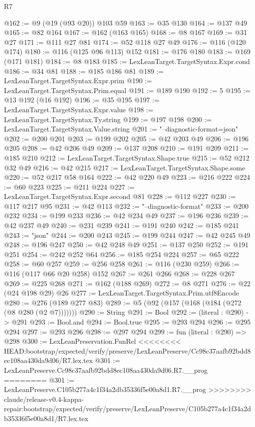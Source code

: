 \begin{lexlean}{R7}
\begin{coremodule}
{{{{{{{{{{{{{@162 := @9 (@19 (@93 @20)) @103 @59
@163 := @35 @130
@164 := @137 @49
@165 := @82 @164
@167 := @162 (@163 @165)
@168 := @8 @167
@169 := @31 @27
@171 := @111 @27 @81
@174 := @52 @118 @27 @49
@176 := @116 (@120 @174)
@180 := @116 (@125 @96 @113) @152
@181 := @176 @180
@183 := @169 (@171 @181)
@184 := @8 @183
@185 := LexLeanTarget.TargetSyntax.Expr.cond
@186 := @34 @81
@188 := @185 @186 @81
@189 := LexLeanTarget.TargetSyntax.Expr.prim
@190 := LexLeanTarget.TargetSyntax.Prim.equal
@191 := @189 @190
@192 := 5
@195 := @13 @192 (@16 @192)
@196 := @35 @195
@197 := LexLeanTarget.TargetSyntax.Expr.value
@198 := LexLeanTarget.TargetSyntax.Ty.string
@199 := @197 @198
@200 := LexLeanTarget.TargetSyntax.Value.string
@201 := "--diagnostic-format=json"
@202 := @200 @201
@203 := @199 @202
@205 := @42 @203 @49
@206 := @196 @205
@208 := @42 @206 @49
@209 := @137 @208
@210 := @191 @209
@211 := @185 @210
@212 := LexLeanTarget.TargetSyntax.Shape.true
@215 := @52 @212 @32 @49
@216 := @42 @215
@217 := LexLeanTarget.TargetSyntax.Shape.some
@220 := @52 @217 @58 @164
@222 := @42 @220 @49
@223 := @216 @222
@224 := @60 @223
@225 := @211 @224
@227 := LexLeanTarget.TargetSyntax.Expr.second @81
@228 := @112 @227
@230 := @117 @217 @95
@231 := @42 @113
@232 := "--diagnostic-format"
@233 := @200 @232
@234 := @199 @233
@236 := @42 @234 @49
@237 := @196 @236
@239 := @42 @237 @49
@240 := @231 @239
@241 := @191 @240
@242 := @185 @241
@243 := "json"
@244 := @200 @243
@245 := @199 @244
@247 := @42 @245 @49
@248 := @196 @247
@250 := @42 @248 @49
@251 := @137 @250
@252 := @191 @251
@254 := @242 @252 @64
@256 := @185 @254 @224
@257 := @65 @222
@258 := @60 @257
@259 := @256 @258
@261 := @116 (@230 @259)
@266 := @116 (@117 @66 @20 @258) @152
@267 := @261 @266
@268 := @228 @267
@269 := @225 @268
@271 := @162 (@188 @269)
@272 := @8 @271
@276 := @22 (@24 @198 @29) @26
@277 := LexLeanTarget.TargetSyntax.Prim.utf8Encode
@280 := @276 (@189 @277 @83)
@289 := @5 (@92 (@157 (@168 (@184 (@272 (@8 @280 (@2 @7)))))))
@290 := String
@291 := Bool
@292 := (literal : @290) -> @291
@293 := Bool.and
@294 := Bool.true
@295 := @293 @294
@296 := @295 @294
@297 := @293 @296
@298 := @297 @294
@299 := fun (literal : @290) => @298
@300 := LexLeanPreservation.FunRel
<<<<<<<< HEAD:bootstrap/expected/verify/preserve/LexLeanPreserve/Cc98c37aafb92bdd8ec108aa430da9d06/R7.lex.tex
@301 := LexLeanPreserve.Cc98c37aafb92bdd8ec108aa430da9d06.R7.__prog
========
@301 := LexLeanPreserve.C105b277a4c1f34a2db35336f5e00a8d1.R7.__prog
>>>>>>>> claude/release-v0.4-kappa-repair:bootstrap/expected/verify/preserve/LexLeanPreserve/C105b277a4c1f34a2db35336f5e00a8d1/R7.lex.tex
}}}}}}}}}}}}}
\end{coremodule}
\end{lexlean}
